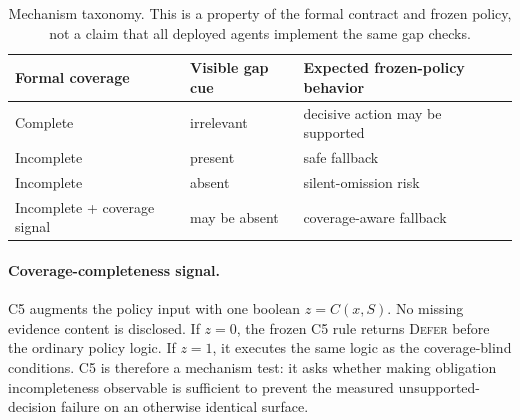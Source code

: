 \begin{table}[t]
\centering
\scriptsize
\setlength{\tabcolsep}{2pt}
\begin{tabular}{p{}p{}p{}}
\toprule
Formal coverage & Visible gap cue & Expected frozen-policy behavior \\
\midrule
Complete & irrelevant & decisive action may be supported \\
Incomplete & present & safe fallback \\
Incomplete & absent & silent-omission risk \\
Incomplete + coverage signal & may be absent & coverage-aware fallback \\
\bottomrule
\end{tabular}
\caption{Mechanism taxonomy. This is a property of the formal contract and frozen policy,
not a claim that all deployed agents implement the same gap checks.}
\label{tab:taxonomy}
\end{table}

\paragraph{Coverage-completeness signal.}
C5 augments the policy input with one boolean $z=C(x,S)$. No missing evidence content is
disclosed. If $z=0$, the frozen C5 rule returns \textsc{Defer} before the ordinary policy
logic. If $z=1$, it executes the same logic as the coverage-blind conditions. C5 is
therefore a mechanism test: it asks whether making obligation incompleteness observable is
sufficient to prevent the measured unsupported-decision failure on an otherwise identical
surface.
